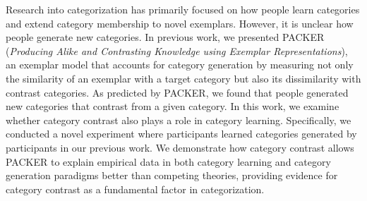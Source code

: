 Research into categorization has primarily focused on how people learn
categories and extend category membership to novel exemplars. However, it is
unclear how people generate new categories. In previous work, we presented
PACKER (\emph{Producing Alike and Contrasting Knowledge using Exemplar
Representations}), an exemplar model that accounts for category generation by
measuring not only the similarity of an exemplar with a target category but also
its dissimilarity with contrast categories. As predicted by PACKER, we found
that people generated new categories that contrast from a given category. In
this work, we examine whether category contrast also plays a role in category
learning. Specifically, we conducted a novel experiment where participants
learned categories generated by participants in our previous work. We
demonstrate how category contrast allows PACKER to explain empirical data in
both category learning and category generation paradigms better than competing
theories, providing evidence for category contrast as a fundamental factor in
categorization.